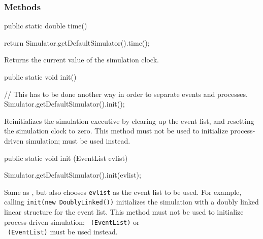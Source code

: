 \subsubsection* {Methods}

\begin{code}

   public static double time() \begin{hide} {
      return Simulator.getDefaultSimulator().time();
   }\end{hide}
\end{code}
   \begin{tabb} Returns the current value of the simulation clock. \end{tabb}
\begin{htmlonly}
\end{htmlonly}
\begin{code}

   public static void init() \begin{hide} {
     // This has to be done another way in order to separate events and processes.
      Simulator.getDefaultSimulator().init();
   }\end{hide}
\end{code}
  \begin{tabb} Reinitializes the simulation executive by clearing up the event
   list, and resetting the simulation clock to zero.
   This method must not be used to initialize process-driven
   simulation; 
   must be used instead.
  \end{tabb}
\begin{code}
 
   public static void init (EventList evlist) \begin{hide} {
     Simulator.getDefaultSimulator().init(evlist);
   }\end{hide}
\end{code}
  \begin{tabb} Same as , but also chooses \texttt{evlist} as the 
    event list to be used. For example, calling 
    \texttt{init(new DoublyLinked())} initializes the simulation
    with a doubly linked linear structure for the event list.
   This method must not be used to initialize process-driven
   simulation; 
~\texttt{(EventList)} or \\
~\texttt{(EventList)} 
   must be used instead.
  \end{tabb}

